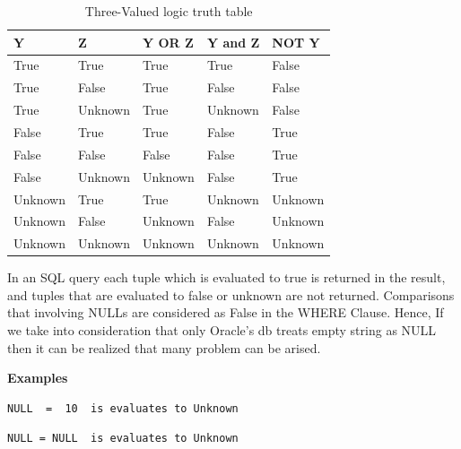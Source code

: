 \begin{table}[h]
\centering
\caption{Three-Valued logic truth table}
\label{my-label}
\begin{tabular}{|l|l|l|l|l| }
\hline
\textbf{Y} & \textbf{Z} & \textbf{Y OR Z} & \textbf{Y and Z} & \textbf{NOT Y} \\ \hline
True       & True       & True            & True             & False          \\ \hline
True       & False      & True            & False            & False          \\ \hline
True       & Unknown    & True            & Unknown          & False          \\ \hline
False      & True       & True            & False            & True           \\ \hline
False      & False      & False           & False            & True           \\ \hline
False      & Unknown    & Unknown         & False            & True           \\ \hline
Unknown    & True       & True            & Unknown          & Unknown        \\ \hline
Unknown    & False      & Unknown         & False            & Unknown        \\ \hline
Unknown    & Unknown    & Unknown         & Unknown          & Unknown        \\ \hline
\end{tabular}
\end{table}

In an SQL query each tuple which is evaluated to true is returned in the result, and tuples that are evaluated to false or unknown are not returned. Comparisons that involving NULLs are considered as False in the WHERE Clause. Hence, If we take into consideration that only Oracle’s db treats empty string as NULL then it can be realized that many problem can be arised. 

\textbf{Examples}

\hfill\newline
\begin{mdframed}[nobreak=true, backgroundcolor=lightgray!20] 
\begin{lstlisting}[style=SQL]
NULL  =  10  is evaluates to Unknown 
\end{lstlisting}
\end{mdframed}

\hfill\newline
\begin{mdframed}[nobreak=true, backgroundcolor=lightgray!20] 
\begin{lstlisting}[style=SQL]
NULL = NULL  is evaluates to Unknown 
\end{lstlisting}
\end{mdframed}

